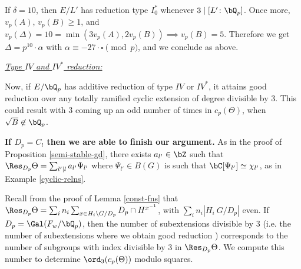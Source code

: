 If $\delta = 10$, then $E / L'$ has reduction type $I_0^*$ whenever $3 \mid [ L' \colon \bQ_p]$. Once more, $v_p(A)$, $v_p(B) \geq 1$, and $v_p(\Delta) = 10 = \min(3 v_p(A), 2 v_p(B)) \implies v_p(B) = 5$. Therefore we get $\Delta = p^{10} \cdot \alpha$ with $\alpha \equiv -27\cdot\square \pmod p$, and we conclude as above.

\vspace{1em}

\noindent\underline{\textit{Type $IV$ and $IV^*$ reduction:}}

Now, if $E /\bQ_p$ has additive reduction of type $IV$ or $IV^*$, it attains good reduction over any totally ramified cyclic extension of degree divisible by $3$. This could result with $3$ coming up an odd number of times in $c_p(\Theta)$, when $\sqrt{B} \not\in \bQ_p$. 

\textbf{If $D_p = C_l$ then we are able to finish our argument.} As in the proof of Proposition \ref{semi-stable-gd}, there exists $a_{l'} \in \bZ$ such that $\Res_{D_p}\Theta = \sum_{l' \mid l} a_{l'} \Psi_{l'}$ where $\Psi_{l'} \in B(G)$ is such that $\bC[\Psi_{l'}] \simeq \chi_{l'}$, as in Example \ref{cyclic-relns}.

Recall from the proof of Lemma \ref{const-fns} that $\Res_{D_p} \Theta = \sum_i n_i \sum_{x \in H_i \backslash G / D_p} D_p \cap H^{x^{-1}}$, with $\sum_i n_i | H_i \ G / D_p|$ even. If $D_p = \Gal(F_w / \bQ_p)$, then the number of subextensions divisible by $3$ (i.e. the number of subextensions where we obtain good reduction ) corresponds to the number of subgroups with index divisible by $3$ in $\Res_{D_p}\Theta$. We compute this number to determine $\ord_3(c_p(\Theta))$ modulo squares.

